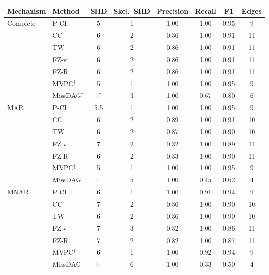 \begin{tabular}{llcccccc}
    \toprule
    Mechanism & Method & SHD & Skel.\ SHD & Precision & Recall & F1 & Edges \\
    \midrule
    Complete  & P-CI               & 5 & 1 & 1.00 & 1.00 & 0.95 & 9 \\
              & CC                 & 6 & 2 & 0.86 & 1.00 & 0.91 & 11 \\
              & TW                 & 6 & 2 & 0.86 & 1.00 & 0.91 & 11 \\
              & FZ-v               & 6 & 2 & 0.86 & 1.00 & 0.91 & 11 \\
              & FZ-R               & 6 & 2 & 0.86 & 1.00 & 0.91 & 11 \\
              & MVPC$^\ddagger$    & 5 & 1 & 1.00 & 1.00 & 0.95 & 9 \\
              & MissDAG$^\dagger$  & \textcolor{lightgray}{3}$^\dagger$ & 3 & 1.00 & 0.67 & 0.80 & 6 \\
    \midrule
    MAR       & P-CI               & 5.5 & 1 & 1.00 & 1.00 & 0.95 & 9 \\
              & CC                 & 6 & 2 & 0.89 & 1.00 & 0.91 & 10 \\
              & TW                 & 6 & 2 & 0.87 & 1.00 & 0.90 & 10 \\
              & FZ-v               & 7 & 2 & 0.82 & 1.00 & 0.89 & 11 \\
              & FZ-R               & 6 & 2 & 0.83 & 1.00 & 0.90 & 11 \\
              & MVPC$^\ddagger$    & 5 & 1 & 1.00 & 1.00 & 0.95 & 9 \\
              & MissDAG$^\dagger$  & \textcolor{lightgray}{5}$^\dagger$ & 5 & 1.00 & 0.45 & 0.62 & 4 \\
    \midrule
    MNAR      & P-CI               & 6 & 1 & 1.00 & 0.91 & 0.94 & 9 \\
              & CC                 & 7 & 2 & 0.86 & 1.00 & 0.90 & 10 \\
              & TW                 & 6 & 2 & 0.86 & 1.00 & 0.90 & 10 \\
              & FZ-v               & 7 & 3 & 0.82 & 1.00 & 0.86 & 11 \\
              & FZ-R               & 7 & 2 & 0.82 & 1.00 & 0.87 & 11 \\
              & MVPC$^\ddagger$    & 6 & 1 & 1.00 & 0.92 & 0.94 & 9 \\
              & MissDAG$^\dagger$  & \textcolor{lightgray}{6}$^\dagger$ & 6 & 1.00 & 0.33 & 0.50 & 4 \\

\end{tabular}
